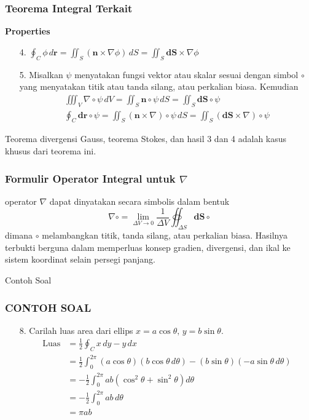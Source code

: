 \documentclass[10pt]{beamer}
\begin{document}
\begin{frame}
\frametitle{Teorema Integral Terkait}
\begin{theorem}
    \textbf{Properties}
    \begin{enumerate}
        \item[4.] $\oint_C \phi \, d\mathbf{r} = \iint_S (\mathbf{n} \times \nabla \phi) \, dS = \iint_S \mathbf{dS} \times \nabla \phi$
        \item[5.] Misalkan $ \psi $ menyatakan fungsi vektor atau skalar sesuai dengan simbol $\circ$ yang menyatakan titik atau tanda silang, atau perkalian biasa. Kemudian
        \begin{align*}
        \iiint_V \nabla \circ \psi \, dV = \iint_S \mathbf{n} \circ \psi \, dS = \iint_S \mathbf{dS} \circ \psi\\
        \oint_C \mathbf{d} \mathbf{r} \circ \psi = \iint_S (\mathbf{n} \times \nabla) \circ \psi \, dS = \iint_S (\mathbf{dS} \times \nabla ) \circ \psi
        \end{align*}
    \end{enumerate}
Teorema divergensi Gauss, teorema Stokes, dan hasil 3 dan 4 adalah kasus khusus dari teorema ini.
\end{theorem}
\end{frame}

\begin{frame}
\frametitle{Formulir Operator Integral untuk \(\nabla\)}
\justifying
operator \(\nabla\) dapat dinyatakan secara simbolis dalam bentuk
\[
\nabla \circ = \lim_{\Delta V \to 0} \frac{1}{\Delta V} \oiint_{\Delta S} \mathbf{dS} \circ
\]
dimana \(\circ\) melambangkan titik, tanda silang, atau perkalian biasa. Hasilnya terbukti berguna dalam memperluas konsep gradien, divergensi, dan ikal ke sistem koordinat selain persegi panjang.
\end{frame}
\begin{frame}{Contoh Soal}
\frametitle{CONTOH SOAL}
\begin{enumerate}
    \item[8.] Carilah luas area dari ellips \( x = a \cos \theta, \, y = b \sin \theta \).
    \begin{align*}
        \text{Luas} &= \frac{1}{2} \oint_C x \, dy - y \, dx \\
        &= \frac{1}{2} \int_0^{2\pi} \left( a \cos \theta \right) \left( b \cos \theta \, d\theta \right) - \left( b \sin \theta \right) \left( -a \sin \theta \, d\theta \right) \\
        &= -\frac{1}{2} \int_0^{2\pi} ab \left( \cos^2 \theta + \sin^2 \theta \right) d\theta \\
        &= -\frac{1}{2} \int_0^{2\pi} ab \, d\theta \\
        &= \pi ab
        \end{align*}
\end{enumerate}
    
\end{frame}
\end{document}

